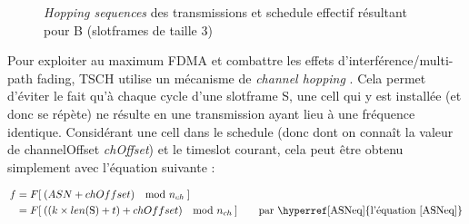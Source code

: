 \documentclass[]{report}
\newcommand{\wordlink}[2]{\hyperref[#2]{#1~\ref{#2}}}
\begin{document}
\begin{figure}[!h]
	\noindent{}
		\caption{\textit{Hopping sequences} des transmissions et schedule effectif résultant pour B (slotframes de taille 3)}
		\label{fig:schedule}
\end{figure}

\newpage

Pour exploiter au maximum FDMA et combattre les effets d'interférence/multi-path fading, TSCH utilise un mécanisme de \textit{channel hopping} \cite{rfc7554}. Cela permet d'éviter le fait qu'à chaque cycle d'une slotframe S, une cell qui y est installée (et donc se répète) ne résulte en une transmission ayant lieu à une fréquence identique. Considérant une cell dans le schedule (donc dont on connaît la valeur de channelOffset \textit{chOffset}) et le timeslot courant, cela peut être obtenu simplement avec l'équation suivante :

\begin{align}
f &= F[\: (ASN + chOffset) \quad \text{mod} \ n_{ch} \: ] \\
  &= F[\: ((k \times len(\text{S}) + t) + chOffset) \quad \text{mod} \ n_{ch} \: ] \qquad \text{par \wordlink{l'équation}{ASNeq}}\label{freqeq}
\end{align}
\end{document}

